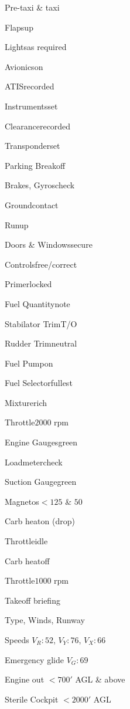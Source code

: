 \begin{multicols}{2}
\begin{checklist}{Pre-taxi \& taxi}
    \item{Flaps}{up}
    \item{Lights}{as required}
    \item{Avionics}{on}
    \item{ATIS}{recorded}
    \item{Instruments}{set}
    \item{Clearance}{recorded}
    \item{Transponder}{set}
    \item{Parking Break}{off}
    \item{Brakes, Gyros}{check}
    \item{Ground}{contact}
\end{checklist}

\begin{checklist}{Runup}
    \item{Doors \& Windows}{secure}
    \item{Controls}{free/correct}
    \item{Primer}{locked}
    \item{Fuel Quantity}{note}
    \item{Stabilator Trim}{T/O}
    \item{Rudder Trim}{neutral}
    \item{Fuel Pump}{on}
    \item{Fuel Selector}{fullest}
    \item{Mixture}{rich}
    \item{Throttle}{$2000$ rpm}
    \item{Engine Gauges}{green}
    \item{Loadmeter}{check}
    \item{Suction Gauge}{green}
    \item{Magnetos}{$<125$ \& $50$}
    \item{Carb heat}{on (drop)}
    \item{Throttle}{idle}
    \item{Carb heat}{off}
    \item{Throttle}{$1000$ rpm}
\end{checklist}

\begin{checklist}{Takeoff briefing}
    \item{Type, Winds, Runway}{}
    \item{Speeds $V_R: 52$, $V_Y: 76$, $V_X: 66$}{}
    \item{Emergency glide $V_G: 69$}{}
    \item{Engine out $<700'$ AGL \& above}{}
    \item{Sterile Cockpit $<2000'$ AGL}{}
\end{checklist}


\end{multicols}
